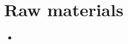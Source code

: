 \documentclass[main.tex]{subfiles}
\begin{document}
\section{Raw materials}

\begin{itemize}
    \item 
\end{itemize}
\end{document}
